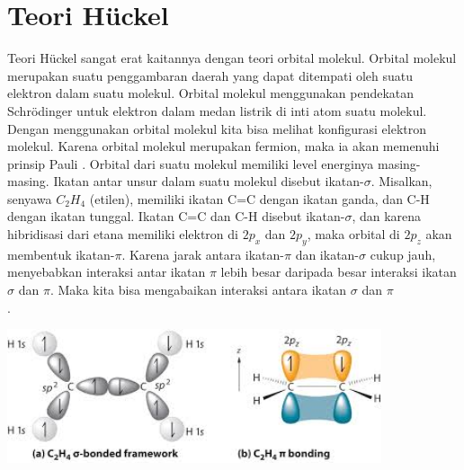 \documentclass[12pt,a4paper]{report}
\begin{document}
	\section{Teori Hückel}
	Teori Hückel sangat erat kaitannya dengan teori orbital molekul. Orbital molekul merupakan suatu penggambaran daerah yang dapat ditempati oleh suatu elektron dalam suatu molekul. Orbital molekul menggunakan pendekatan Schrödinger untuk elektron dalam medan listrik di inti atom suatu molekul. Dengan menggunakan orbital molekul kita bisa melihat konfigurasi elektron molekul. Karena orbital molekul merupakan fermion, maka ia akan memenuhi prinsip Pauli \cite{Coton1990}. Orbital dari suatu molekul memiliki level energinya masing-masing. Ikatan antar unsur dalam suatu molekul disebut ikatan-{$\sigma$}. Misalkan, senyawa {$C_2H_4$} (etilen), memiliki ikatan C=C dengan ikatan ganda, dan C-H dengan ikatan tunggal. Ikatan C=C dan C-H disebut ikatan-{$\sigma$}, dan karena hibridisasi dari etana memiliki elektron di {$2p_x$} dan {$2p_y$}, maka orbital di {$2p_z$} akan membentuk ikatan-{$\pi$}. Karena jarak antara ikatan-{$\pi$} dan ikatan-{$\sigma$} cukup jauh, menyebabkan interaksi antar ikatan {$\pi$} lebih besar daripada besar interaksi ikatan {$\sigma$} dan {$\pi$}. Maka kita bisa mengabaikan interaksi antara ikatan {$\sigma$} dan {$\pi$} \cite{Siregar2014}\\.
	\begin{center}
		\includegraphics[width=11cm]{gambar/etilen.jpeg}
	\end{center}
	
\end{document}
